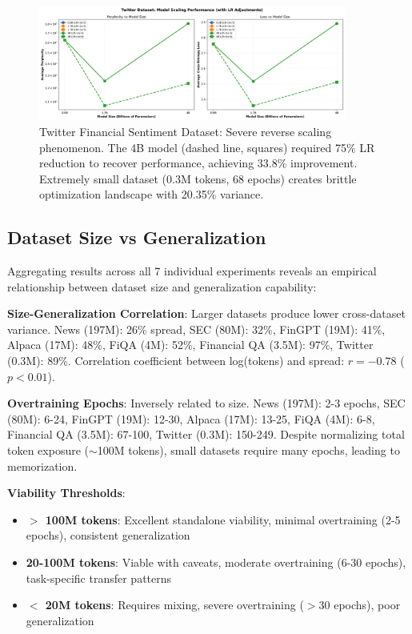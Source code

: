 \begin{figure}[h]
\centering
\includegraphics[width=0.9\textwidth]{figures/scaling_twitter.png}
\caption[Twitter Financial Sentiment Dataset: Reverse Scaling]{Twitter Financial Sentiment Dataset: Severe reverse scaling phenomenon. The 4B model (dashed line, squares) required 75\% LR reduction to recover performance, achieving 33.8\% improvement. Extremely small dataset (0.3M tokens, 68 epochs) creates brittle optimization landscape with 20.35\% variance.}
\label{fig:scaling_twitter}
\end{figure}





\subsection{Dataset Size vs Generalization}

Aggregating results across all 7 individual experiments reveals an empirical relationship between dataset size and generalization capability:

\textbf{Size-Generalization Correlation}: Larger datasets produce lower cross-dataset variance. News (197M): 26\% spread, SEC (80M): 32\%, FinGPT (19M): 41\%, Alpaca (17M): 48\%, FiQA (4M): 52\%, Financial QA (3.5M): 97\%, Twitter (0.3M): 89\%. Correlation coefficient between log(tokens) and spread: $r = -0.78$ ($p < 0.01$).

\textbf{Overtraining Epochs}: Inversely related to size. News (197M): 2-3 epochs, SEC (80M): 6-24, FinGPT (19M): 12-30, Alpaca (17M): 13-25, FiQA (4M): 6-8, Financial QA (3.5M): 67-100, Twitter (0.3M): 150-249. Despite normalizing total token exposure ($\sim$100M tokens), small datasets require many epochs, leading to memorization.

\textbf{Viability Thresholds}:
\begin{itemize}
\item \textbf{$>$ 100M tokens}: Excellent standalone viability, minimal overtraining (2-5 epochs), consistent generalization
\item \textbf{20-100M tokens}: Viable with caveats, moderate overtraining (6-30 epochs), task-specific transfer patterns
\item \textbf{$<$ 20M tokens}: Requires mixing, severe overtraining ($>$30 epochs), poor generalization
\end{itemize}

